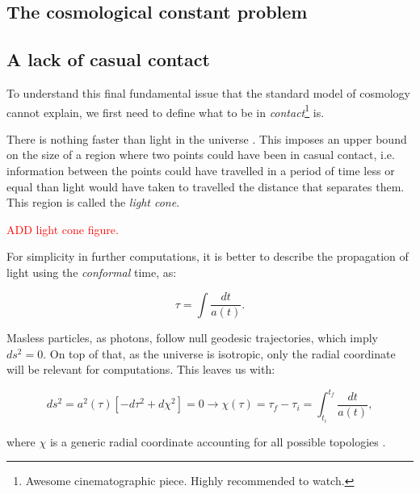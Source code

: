 \documentclass[11pt, a4paper]{article} %
\begin{document}
\subsection*{The cosmological constant problem}

\subsection*{A lack of casual contact}

To understand this final fundamental issue that the standard model of cosmology cannot explain, we first need to define what to be in \textit{contact}\footnote{Awesome cinematographic piece. Highly recommended to watch.} is.

There is nothing faster than light in the universe \cite{}. This imposes an upper bound on the size of a region where two points could have been in casual contact, i.e. information between the points could have travelled in a period of time less or equal than light would have taken to travelled the distance that separates them. This region is called the \textit{light cone}. 

\textcolor{red}{ADD light cone figure.}

For simplicity in further computations, it is better to describe the propagation of light using the \textit{conformal} time, as:

\begin{equation}
	\tau = \int \frac{dt}{a(t)}.
\end{equation}

Masless particles, as photons, follow null geodesic trajectories, which imply $ds^{2} = 0$. On top of that, as the universe is isotropic, only the radial coordinate will be relevant for computations. This leaves us with:

\begin{equation}
	ds^{2} = a^{2}(\tau)\left[-d\tau^{2} + d\chi^{2}\right]=0 \longrightarrow \chi(\tau) = \tau_{f} - \tau_{i} = \int^{t_{f}}_{t_{i}} \frac{dt}{a(t)},
\end{equation}

where $\chi$ is a generic radial coordinate accounting for all possible topologies \cite{}. 








\end{document}
